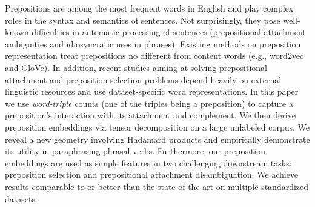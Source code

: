 Prepositions are among the most frequent words in English and play complex roles in the syntax and semantics of sentences. Not surprisingly, they pose well-known difficulties in automatic processing of sentences (prepositional attachment ambiguities and idiosyncratic uses in phrases). Existing methods on preposition representation  treat prepositions no different from content words (e.g., word2vec and GloVe). In addition, recent studies aiming at solving prepositional attachment and preposition selection problems depend heavily on external linguistic resources and use dataset-specific word representations. In this paper we use {\em word-triple} counts (one of the triples being a preposition) to  capture a preposition's interaction with its attachment and complement. We then derive preposition embeddings via tensor decomposition on a large unlabeled corpus. We reveal a new geometry involving Hadamard products and empirically demonstrate its utility in paraphrasing  phrasal verbs. Furthermore, our preposition  embeddings are used as simple features in two challenging downstream tasks: preposition selection and prepositional attachment disambiguation. We achieve results comparable to or better than the state-of-the-art on  multiple standardized datasets.
